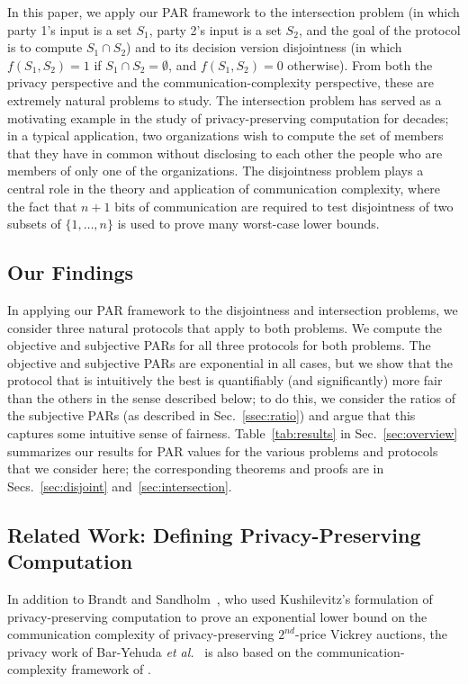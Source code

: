 \documentclass{article}
\theoremstyle{theorem}
\theoremstyle{definition}
\theoremstyle{remark}
\begin{document}
In this paper, we apply our PAR framework to the intersection problem (in which party 1's input
is a set $S_1$, party 2's input is a set $S_2$, and the goal of the protocol is to compute
$S_1 \cap S_2$) and to its decision version disjointness (in which $f(S_1, S_2) = 1$ if
$S_1 \cap S_2 = \emptyset$, and $f(S_1, S_2) = 0$ otherwise).  From both the privacy perspective
and the communication-complexity perspective, these are extremely natural problems to study.
The intersection problem has served as a motivating example in the study of privacy-preserving
computation for decades; in a typical application, two organizations wish to compute the set of
members that they have in common without disclosing to each other the people who are members of
only one of the organizations.  The disjointness problem plays a central role in the theory and
application of communication complexity, where the fact that $n+1$ bits of communication are
required to test disjointness of two subsets of $\{1, \ldots, n\}$ is used to prove many
worst-case lower bounds.

\subsection{Our Findings}



In applying our PAR framework to the disjointness and intersection problems, we consider three natural
protocols that apply to both problems.  We compute the objective and subjective PARs for all three protocols for both problems.  The objective and subjective PARs are
exponential in all cases, but we show that the protocol that is intuitively the
best is quantifiably (and significantly) more fair than the others in the sense
described below; to do this, we consider the ratios of the subjective PARs (as described in Sec.~\ref{ssec:ratio}) and argue that this captures some intuitive sense of fairness.  Table~\ref{tab:results} in Sec.~\ref{sec:overview} summarizes our
results for PAR values for the various problems and protocols that we consider here; the corresponding theorems and proofs are in Secs.~\ref{sec:disjoint} and~\ref{sec:intersection}.



\subsection{Related Work: Defining Privacy-Preserving
Computation}

In addition to Brandt and Sandholm~\cite{BS}, who used Kushilevitz's formulation of privacy-preserving
computation to prove an exponential lower bound on the communication complexity of
privacy-preserving $2^{nd}$-price Vickrey auctions, the privacy work of Bar-Yehuda {\it et
al.}~\cite{BCKO} is also based on the communication-complexity framework of \cite{CK91,K92}.
\end{document}
